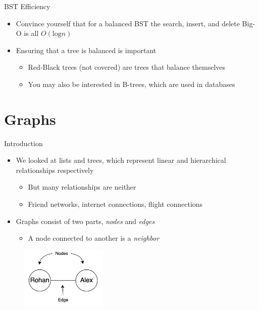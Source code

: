 \documentclass[
  ignorenonframetext,
]{beamer}
\providecommand{\tightlist}{%
  \setlength{\itemsep}{0pt}\setlength{\parskip}{0pt}}\usepackage{longtable,booktabs,array}
\begin{document}
\begin{frame}{BST Efficiency}
\protect\hypertarget{bst-efficiency-1}{}
\begin{itemize}
\item
  Convince yourself that for a balanced BST the search, insert, and
  delete Big-O is all \(O(\text{log}n)\)
\item
  Ensuring that a tree is balanced is important

  \begin{itemize}
  \item
    Red-Black trees (not covered) are trees that balance themselves
  \item
    You may also be interested in B-trees, which are used in databases
  \end{itemize}
\end{itemize}
\end{frame}

\hypertarget{graphs}{%
\section{Graphs}\label{graphs}}

\begin{frame}{Introduction}
\protect\hypertarget{introduction}{}
\begin{itemize}
\item
  We looked at lists and trees, which represent linear and hierarchical
  relationships respectively

  \begin{itemize}
  \item
    But many relationships are neither
  \item
    Friend networks, internet connections, flight connections
  \end{itemize}
\item
  Graphs consist of two parts, \emph{nodes} and \emph{edges}

  \begin{itemize}
  \tightlist
  \item
    A node connected to another is a \emph{neighbor} \vspace{1cm}
  \end{itemize}
\end{itemize}

\begin{figure}

{\centering \includegraphics[width=1.625in,height=\textheight]{images/graph-anat.png}

}

\end{figure}
\end{frame}
\end{document}
